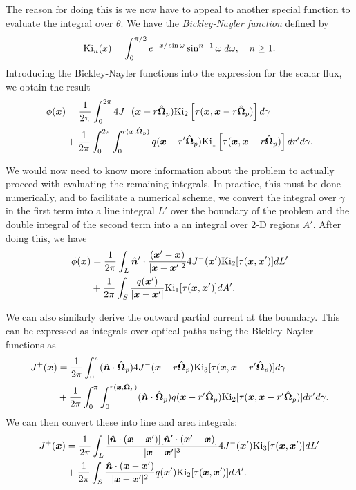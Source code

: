 The reason for doing this is we now have to appeal to another special function to evaluate the integral over $\theta$. We have the \emph{Bickley-Nayler function} defined by
\begin{align}
  \textrm{Ki}_n(x) = \int_0^{\pi/2} e^{-x/\sin\omega}  \sin^{n-1}\omega \hspace{0.25em} d\omega , \quad n \ge 1. \nonumber
\end{align}
Introducing the Bickley-Nayler functions into the expression for the scalar flux, we obtain the result
\begin{align} \label{Eq:transport_scalarFlux_OpticalPathIntegrals}
  \phi(\bm{x}) &= \frac{1}{2\pi} \int_0^{2\pi} 4 J^-(\bm{x} - r \hat{\mathbf{\Omega}}_p) \textrm{Ki}_2 \left[ \tau(\bm{x},\bm{x} - r \hat{\mathbf{\Omega}}_p) \right] d\gamma \nonumber \\*
  &+ \frac{1}{2\pi} \int_0^{2\pi} \int_0^{r(\bm{x},\hat{\mathbf{\Omega}}_p)} q( \bm{x} - r' \hat{\mathbf{\Omega}}_p ) \textrm{Ki}_1 \left[ \tau(\bm{x},\bm{x} - r \hat{\mathbf{\Omega}}_p) \right] dr' d\gamma.
\end{align}

We would now need to know more information about the problem to actually proceed with evaluating the remaining integrals. In practice, this must be done numerically, and to facilitate a numerical scheme, we convert the integral over $\gamma$ in the first term into a line integral $L'$ over the boundary of the problem and the double integral of the second term into a an integral over 2-D regions $A'$. After doing this, we have
\begin{align}
  \phi(\bm{x}) &= \frac{1}{2\pi} \int_L \hat{\bm{n}}' \cdot \frac{( \bm{x}' - \bm{x} )}{|\bm{x} - \bm{x}'|^2} 4 J^-(\bm{x}') \textrm{Ki}_2 [ \tau(\bm{x},\bm{x}') ] dL' \nonumber \\
  &+ \frac{1}{2\pi} \int_S \frac{q( \bm{x}' )}{ |\bm{x} - \bm{x}'| } \textrm{Ki}_1 [ \tau(\bm{x},\bm{x}') ] dA'.
\end{align}

We can also similarly derive the outward partial current at the boundary. This can be expressed as integrals over optical paths using the Bickley-Nayler functions as
\begin{align} \label{Eq:transport_outwardPartialCurrent_OpticalPathIntegrals}
  J^+(\bm{x}) &= \frac{1}{2\pi} \int_0^\pi ( \hat{\bm{n}} \cdot \hat{\mathbf{\Omega}}_p )  4J^-(\bm{x} - r \hat{\mathbf{\Omega}}_p) \textrm{Ki}_3 [ \tau(\bm{x},\bm{x} - r' \hat{\mathbf{\Omega}}_p) ] d\gamma \nonumber \\*
  &+ \frac{1}{2\pi} \int_0^\pi \int_0^{r(\bm{x},\hat{\mathbf{\Omega}}_p)}  ( \hat{\bm{n}} \cdot \hat{\mathbf{\Omega}}_p ) q( \bm{x} - r' \hat{\mathbf{\Omega}}_p ) \textrm{Ki}_2 [ \tau(\bm{x},\bm{x} - r' \hat{\mathbf{\Omega}}_p) ] dr' d\gamma .
\end{align}
We can then convert these into line and area integrals:
\begin{align}
  J^+(\bm{x}) &= \frac{1}{2\pi} \int_L \frac{[ \hat{\bm{n}} \cdot (\bm{x} - \bm{x}') ][ \hat{\bm{n}}' \cdot (\bm{x}' - \bm{x}) ]}{|\bm{x} - \bm{x}'|^3} 4J^-(\bm{x}') \textrm{Ki}_3 [ \tau(\bm{x},\bm{x}') ] dL' \nonumber \\*
  &+ \frac{1}{2\pi} \int_S \frac{ \hat{\bm{n}} \cdot ( \bm{x} - \bm{x}') }{|\bm{x} - \bm{x}'|^2} q( \bm{x}' ) \textrm{Ki}_2 [ \tau(\bm{x},\bm{x}') ] dA'.
\end{align}

